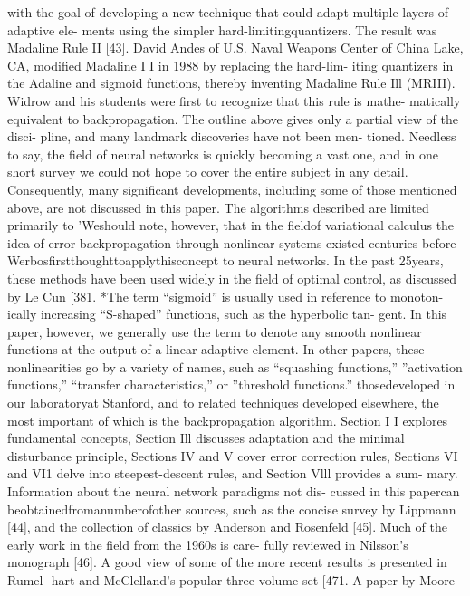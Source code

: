 with the goal of developing a new technique that could adapt multiple
layers of adaptive ele- ments using the simpler hard-limitingquantizers.
The result was Madaline Rule II {[}43{]}. David Andes of U.S. Naval
Weapons Center of China Lake, CA, modified Madaline I I in 1988 by
replacing the hard-lim- iting quantizers in the Adaline and sigmoid
functions, thereby inventing Madaline Rule Ill (MRIII). Widrow and his
students were first to recognize that this rule is mathe- matically
equivalent to backpropagation. The outline above gives only a partial
view of the disci- pline, and many landmark discoveries have not been
men- tioned. Needless to say, the field of neural networks is quickly
becoming a vast one, and in one short survey we could not hope to cover
the entire subject in any detail. Consequently, many significant
developments, including some of those mentioned above, are not discussed
in this paper. The algorithms described are limited primarily to
'Weshould note, however, that in the fieldof variational calculus the
idea of error backpropagation through nonlinear systems existed
centuries before Werbosfirstthoughttoapplythisconcept to neural
networks. In the past 25years, these methods have been used widely in
the field of optimal control, as discussed by Le Cun {[}381. *The term
``sigmoid'' is usually used in reference to monoton- ically increasing
``S-shaped'' functions, such as the hyperbolic tan- gent. In this paper,
however, we generally use the term to denote any smooth nonlinear
functions at the output of a linear adaptive element. In other papers,
these nonlinearities go by a variety of names, such as ``squashing
functions,'' ''activation functions,'' ``transfer characteristics,'' or
''threshold functions.'' thosedeveloped in our laboratoryat Stanford,
and to related techniques developed elsewhere, the most important of
which is the backpropagation algorithm. Section I I explores fundamental
concepts, Section Ill discusses adaptation and the minimal disturbance
principle, Sections IV and V cover error correction rules, Sections VI
and VI1 delve into steepest-descent rules, and Section Vlll provides a
sum- mary. Information about the neural network paradigms not dis-
cussed in this papercan beobtainedfromanumberofother sources, such as
the concise survey by Lippmann {[}44{]}, and the collection of classics
by Anderson and Rosenfeld {[}45{]}. Much of the early work in the field
from the 1960s is care- fully reviewed in Nilsson's monograph {[}46{]}.
A good view of some of the more recent results is presented in Rumel-
hart and McClelland's popular three-volume set {[}471. A paper by Moore
